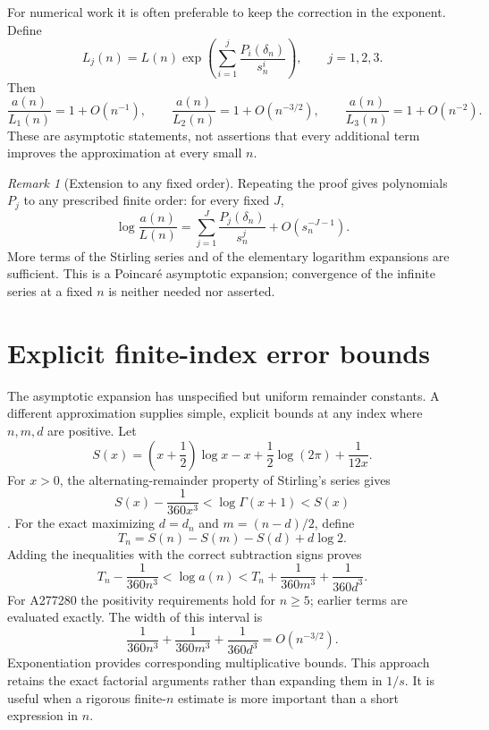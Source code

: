 \documentclass[11pt,letterpaper]{article}
\theoremstyle{remark}
\newtheorem{remark}[theorem]{Remark}
\begin{document}
For numerical work it is often preferable to keep the correction in the
exponent. Define
\begin{equation}\label{eq:Lj}
 L_j(n)=L(n)\exp\left(\sum_{i=1}^{j}
                  \frac{P_i(\delta_n)}{s_n^i}\right),
 \qquad j=1,2,3.
\end{equation}
Then
\[
 \frac{a(n)}{L_1(n)}=1+O(n^{-1}),\qquad
 \frac{a(n)}{L_2(n)}=1+O(n^{-3/2}),\qquad
 \frac{a(n)}{L_3(n)}=1+O(n^{-2}).
\]
These are asymptotic statements, not assertions that every additional term
improves the approximation at every small $n$.

\begin{remark}[Extension to any fixed order]
Repeating the proof gives polynomials $P_j$ to any prescribed finite order:
for every fixed $J$,
\[
 \log\frac{a(n)}{L(n)}
 =\sum_{j=1}^J\frac{P_j(\delta_n)}{s_n^j}+O(s_n^{-J-1}).
\]
More terms of the Stirling series and of the elementary logarithm expansions
are sufficient. This is a Poincar\'e asymptotic expansion; convergence of the
infinite series at a fixed $n$ is neither needed nor asserted.
\end{remark}

\section{Explicit finite-index error bounds}\label{sec:bounds}

The asymptotic expansion has unspecified but uniform remainder constants.
A different approximation supplies simple, explicit bounds at any index
where $n,m,d$ are positive. Let
\begin{equation}\label{eq:S}
 S(x)=\left(x+\frac12\right)\log x-x+\frac12\log(2\pi)
      +\frac{1}{12x}.
\end{equation}
For $x>0$, the alternating-remainder property of Stirling's series gives
\begin{equation}\label{eq:Stirlingbounds}
 S(x)-\frac{1}{360x^3}<\log\Gamma(x+1)<S(x)
\end{equation}
\cite{dlmfgamma}. For the exact maximizing $d=d_n$ and $m=(n-d)/2$, define
\[
 T_n=S(n)-S(m)-S(d)+d\log2.
\]
Adding the inequalities with the correct subtraction signs proves
\begin{equation}\label{eq:explicitbounds}
 \boxed{\displaystyle
 T_n-\frac{1}{360n^3}
 <\log a(n)<
 T_n+\frac{1}{360m^3}+\frac{1}{360d^3}.}
\end{equation}
For A277280 the positivity requirements hold for $n\ge5$; earlier terms
are evaluated exactly. The width of this interval is
\[
 \frac{1}{360n^3}+\frac{1}{360m^3}+\frac{1}{360d^3}
 =O(n^{-3/2}).
\]
Exponentiation provides corresponding multiplicative bounds. This approach
retains the exact factorial arguments rather than expanding them in $1/s$.
It is useful when a rigorous finite-$n$ estimate is more important than a
short expression in $n$.
\end{document}
